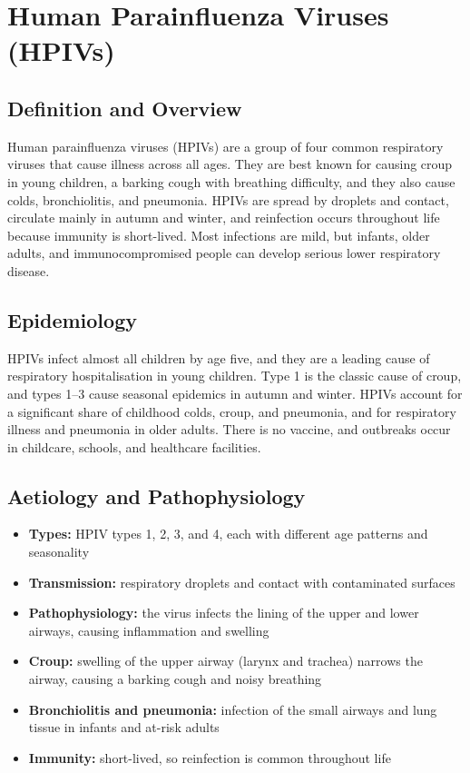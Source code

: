 \chapter{Human Parainfluenza Viruses (HPIVs)}

\section*{Definition and Overview}
Human parainfluenza viruses (HPIVs) are a group of four common respiratory viruses that cause illness across all ages. They are best known for causing croup in young children, a barking cough with breathing difficulty, and they also cause colds, bronchiolitis, and pneumonia. HPIVs are spread by droplets and contact, circulate mainly in autumn and winter, and reinfection occurs throughout life because immunity is short-lived. Most infections are mild, but infants, older adults, and immunocompromised people can develop serious lower respiratory disease.

\section*{Epidemiology}
HPIVs infect almost all children by age five, and they are a leading cause of respiratory hospitalisation in young children. Type 1 is the classic cause of croup, and types 1--3 cause seasonal epidemics in autumn and winter. HPIVs account for a significant share of childhood colds, croup, and pneumonia, and for respiratory illness and pneumonia in older adults. There is no vaccine, and outbreaks occur in childcare, schools, and healthcare facilities.

\section*{Aetiology and Pathophysiology}
\begin{itemize}
    \item \textbf{Types:} HPIV types 1, 2, 3, and 4, each with different age patterns and seasonality
    \item \textbf{Transmission:} respiratory droplets and contact with contaminated surfaces
    \item \textbf{Pathophysiology:} the virus infects the lining of the upper and lower airways, causing inflammation and swelling
    \item \textbf{Croup:} swelling of the upper airway (larynx and trachea) narrows the airway, causing a barking cough and noisy breathing
    \item \textbf{Bronchiolitis and pneumonia:} infection of the small airways and lung tissue in infants and at-risk adults
    \item \textbf{Immunity:} short-lived, so reinfection is common throughout life
\end{itemize}

